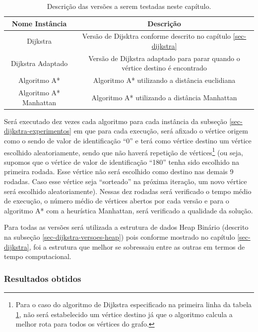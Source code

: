 \begin{table}[H]
\caption{Descrição das versões a serem testadas neste capítulo.}
\label{tbl-aestrela-instancias}
\centering
\begin{adjustbox}{max width=\textwidth}
\begin{tabular}{|c|c|}
\hline 
\textbf{Nome Instância} & \textbf{Descrição} \\ 
\hline 
Dijkstra & Versão de Dijsktra conforme descrito no capítulo \ref{sec-dijkstra} \\ 
\hline 
Dijkstra Adaptado & Versão de Dijkstra adaptado para parar quando o vértice destino é encontrado \\ 
\hline 
Algoritmo A* & Algoritmo A* utilizando a distância euclidiana \\ 
\hline 
Algoritmo A* Manhattan & Algoritmo A* utilizando a distância Manhattan \\ 
\hline 
\end{tabular} 
\end{adjustbox}
\end{table}

Será executado dez vezes cada algoritmo para cada instância da subseção \ref{sec-dijkstra-experimentos} em que para cada execução, será afixado o vértice origem como o sendo de valor de identificação ``0'' e terá como vértice destino um vértice escolhido aleatoriamente, sendo que não haverá repetição de vértices\footnote{Para o caso do algoritmo de Dijkstra especificado na primeira linha da tabela \ref{tbl-aestrela-instancias}, não será estabelecido um vértice destino já que o algoritmo calcula a melhor rota para todos os vértices do grafo.} (ou seja, supomos que o vértice de valor de identificação ``180'' tenha sido escolhido na primeira rodada. Esse vértice não será escolhido como destino nas demais 9 rodadas. Caso esse vértice seja ``sorteado'' na próxima iteração, um novo vértice será escolhido aleatoriamente). Nessas dez rodadas será verificado o tempo médio de execução, o número médio de vértices abertos por cada versão e para o algoritmo A* com a heurística Manhattan, será verificado a qualidade da solução.

Para todas as versões será utilizada a estrutura de dados Heap Binário (descrito na subseção \ref{sec-dijkstra-versoes-heap}) pois conforme mostrado no capítulo \ref{sec-dijkstra}, foi a estrutura que melhor se sobressaiu entre as outras em termos de tempo computacional.

\subsubsection{Resultados obtidos}
\label{sec-aestrela-instancias-resultados}

